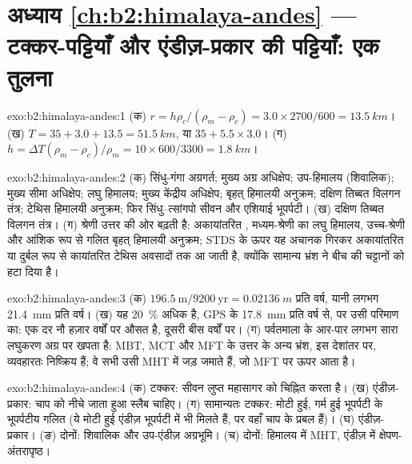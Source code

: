 \section*{अध्याय \ref{ch:b2:himalaya-andes} --- टक्कर-पट्टियाँ और एंडीज़-प्रकार की पट्टियाँ: एक तुलना}

\begin{solution}{exo:b2:himalaya-andes:1}
(क) $r = h\rho_c/(\rho_m - \rho_c) = 3.0\times2700/600 = \qty{13.5}{km}$। (ख) $T = 35 + 3.0 +
13.5 = \qty{51.5}{km}$, या $35 + 5.5\times3.0$। (ग) $h = \Delta T(\rho_m - \rho_c)/\rho_m =
10\times600/3300 = \qty{1.8}{km}$।
\end{solution}

\begin{solution}{exo:b2:himalaya-andes:2}
(क) सिंधु-गंगा अग्रगर्त; मुख्य अग्र अधिक्षेप; उप-हिमालय (शिवालिक); मुख्य सीमा
अधिक्षेप; लघु हिमालय; मुख्य केंद्रीय अधिक्षेप; बृहत् हिमालयी अनुक्रम; दक्षिण तिब्बत
विलगन तंत्र; टेथिस हिमालयी अनुक्रम; फिर सिंधु--त्सांगपो सीवन और एशियाई
भूपर्पटी। (ख) दक्षिण तिब्बत विलगन तंत्र। (ग) श्रेणी उत्तर की ओर बढ़ती है: अकायांतरित
, मध्यम-श्रेणी का लघु हिमालय, उच्च-श्रेणी और आंशिक रूप से गलित बृहत् हिमालयी
अनुक्रम; STDS के ऊपर यह अचानक गिरकर अकायांतरित या दुर्बल रूप से कायांतरित
टेथिस अवसादों तक आ जाती है, क्योंकि सामान्य भ्रंश ने बीच की चट्टानों को हटा दिया है।
\end{solution}

\begin{solution}{exo:b2:himalaya-andes:3}
(क) $196.5\ \text{m}/9200\ \text{yr} = \qty{0.02136}{m}$ प्रति वर्ष, यानी लगभग \qty{21.4}{mm} प्रति वर्ष।
(ख) यह \qty{20}{\percent} अधिक है, GPS के \qty{17.8}{mm} प्रति वर्ष से, पर उसी परिमाण का:
एक दर नौ हज़ार वर्षों पर औसत है, दूसरी बीस वर्षों पर।
(ग) पर्वतमाला के आर-पार लगभग सारा लघुकरण अग्र पर खपता है: MBT, MCT और
MFT के उत्तर के अन्य भ्रंश, इस देशांतर पर, व्यवहारतः निष्क्रिय हैं; वे सभी
उसी MHT में जड़ जमाते हैं, जो MFT पर ऊपर आता है।
\end{solution}

\begin{solution}{exo:b2:himalaya-andes:4}
(क) टक्कर: सीवन लुप्त महासागर को चिह्नित करता है। (ख) एंडीज़-प्रकार: चाप को नीचे जाता हुआ
स्लैब चाहिए। (ग) सामान्यतः टक्कर: मोटी हुई, गर्म हुई भूपर्पटी के भूपर्पटीय गलित (ये
मोटी हुई एंडीज़ भूपर्पटी में भी मिलते हैं, पर वहाँ चाप के  प्रबल हैं)। (घ) एंडीज़-प्रकार।
(ङ) दोनों: शिवालिक और उप-एंडीज़ अग्रभूमि। (च) दोनों: हिमालय में MHT,
एंडीज़ में क्षेपण-अंतरापृष्ठ।
\end{solution}

